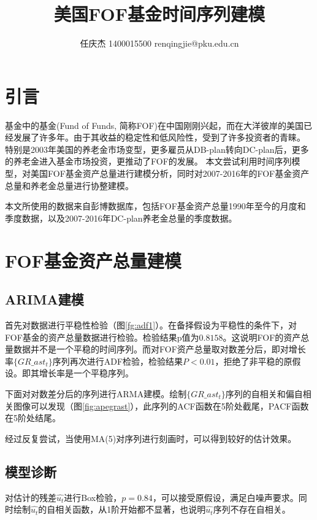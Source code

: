 \documentclass[10.5pt,onecolumn,a4paper]{article}%
\author{任庆杰 1400015500   renqingjie@pku.edu.cn}
\title{美国FOF基金时间序列建模}
\begin{document}
\maketitle{}
\section{引言}
基金中的基金(Fund of Funds, 简称FOF)在中国刚刚兴起，而在大洋彼岸的美国已经发展了许多年。由于其收益的稳定性和低风险性，受到了许多投资者的青睐。
特别是2003年美国的养老金市场变型，更多雇员从DB-plan转向DC-plan后，更多的养老金进入基金市场投资，更推动了FOF的发展。
本文尝试利用时间序列模型，对美国FOF基金资产总量进行建模分析，同时对2007-2016年的FOF基金资产总量和养老金总量进行协整建模。

本文所使用的数据来自彭博数据库，包括FOF基金资产总量1990年至今的月度和季度数据，以及2007-2016年DC-plan养老金总量的季度数据。

\section{FOF基金资产总量建模}
\subsection{ARIMA建模}
首先对数据进行平稳性检验（图\ref{fg:adf1}）。在备择假设为平稳性的条件下，对FOF基金的资产总量数据进行检验。检验结果p值为$0.8158$。这说明FOF的资产总量数据并不是一个平稳的时间序列。而对FOF资产总量取对数差分后，即对增长率$\{GR\_ast_t\}$序列再次进行ADF检验，检验结果$P<0.01$，拒绝了非平稳的原假设。即其增长率是一个平稳序列。



下面对对数差分后的序列进行ARMA建模。绘制$\{GR\_ast_t\}$序列的自相关和偏自相关图像可以发现（图\ref{fig:apegrast}），此序列的ACF函数在5阶处截尾，PACF函数在5阶处结尾。
{}





经过反复尝试，当使用MA(5)对序列进行刻画时，可以得到较好的估计效果。


\subsection{模型诊断}

对估计的残差$\hat{u_t}$进行Box检验，$p=0.84$，可以接受原假设，满足白噪声要求。同时绘制$\hat{u_t}$的自相关函数，从1阶开始都不显著，也说明$\hat{u_t}$序列不存在自相关。
\end{document}
